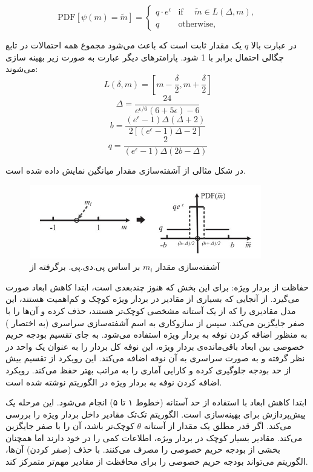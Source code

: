 \begin{equation}
\text{PDF}[\psi(m) = \tilde{m}] = 
\begin{cases} 
q \cdot e^{\epsilon} & \text{if } \quad \tilde{m} \in L(\Delta, m), \\
q & \text{otherwise},
\end{cases}
\end{equation}

در عبارت بالا $q$ یک مقدار ثابت است که باعث می‌شود مجموع همه احتمالات در تابع چگالی احتمال برابر با 1 شود. پارامترهای دیگر عبارت به صورت زیر بهینه سازی می‌شوند:
$$L(\delta, m) = \left[m - \frac{\delta}{2}, m + \frac{\delta}{2}\right]$$
$$\Delta = \frac{24}{e^{\epsilon/6}(6+5\epsilon)-6}$$
$$b = \frac{(e^{\epsilon}-1)\Delta(\Delta+2)}{2[(e^{\epsilon}-1)\Delta-2]}$$
$$q = \frac{2}{(e^{\epsilon}-1)\Delta(2b-\Delta)}$$

در شکل  مثالی از آشفته‌سازی مقدار میانگین نمایش داده شده است.

\begin{figure}[h]
  \centering
  \includegraphics[width=0.9\textwidth]{figs/PDP.jpg}
  \caption{آشفته‌سازی مقدار $m_i$ بر اساس پی.دی.پی. برگرفته از }
  \label{fig:PDP}
\end{figure}

 حفاظت از بردار ویژه: برای این بخش که هنوز چندبعدی است، ابتدا کاهش ابعاد صورت می‌گیرد. از آنجایی که بسیاری از مقادیر در بردار ویژه کوچک و کم‌اهمیت هستند، این مدل مقادیری را که از یک آستانه مشخصی کوچک‌تر هستند، حذف کرده و آن‌ها را با صفر جایگزین می‌کند. سپس از سازوکاری به اسم آشفته‌سازی سراسری (به اختصار ) به منظور اضافه کردن نوفه به بردار ویژه استفاده می‌شود. به جای تقسیم بودجه حریم خصوصی بین ابعاد باقی‌مانده‌ی بردار ویژه، این نوفه کل بردار را به عنوان یک واحد در نظر گرفته و به صورت سراسری به آن نوفه اضافه می‌کند. این رویکرد از تقسیم بیش از حد بودجه جلوگیری کرده و کارایی آماری را به مراتب بهتر حفظ می‌کند. رویکرد اضافه کردن نوفه به بردار ویژه در الگوریتم  نوشته شده است.

ابتدا کاهش ابعاد با استفاده از حد آستانه (خطوط ۱ تا ۵) انجام می‌شود. این مرحله یک پیش‌پردازش برای بهینه‌سازی است. الگوریتم تک‌تک مقادیر داخل بردار ویژه را بررسی می‌کند. اگر قدر مطلق یک مقدار از آستانه $\theta$ کوچک‌تر باشد، آن را با صفر جایگزین می‌کند. مقادیر بسیار کوچک در بردار ویژه، اطلاعات کمی را در خود دارند اما همچنان بخشی از بودجه حریم خصوصی را مصرف می‌کنند. با حذف (صفر کردن) آن‌ها، الگوریتم می‌تواند بودجه حریم خصوصی را برای محافظت از مقادیر مهم‌تر متمرکز کند.

